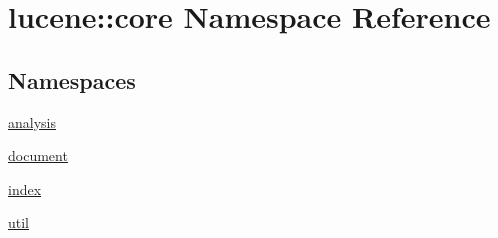 \hypertarget{namespacelucene_1_1core}{}\section{lucene\+:\+:core Namespace Reference}
\label{namespacelucene_1_1core}
\subsection*{Namespaces}
\begin{DoxyCompactItemize}
\item 
 \mbox{\hyperlink{namespacelucene_1_1core_1_1analysis}{analysis}}
\item 
 \mbox{\hyperlink{namespacelucene_1_1core_1_1document}{document}}
\item 
 \mbox{\hyperlink{namespacelucene_1_1core_1_1index}{index}}
\item 
 \mbox{\hyperlink{namespacelucene_1_1core_1_1util}{util}}
\end{DoxyCompactItemize}
